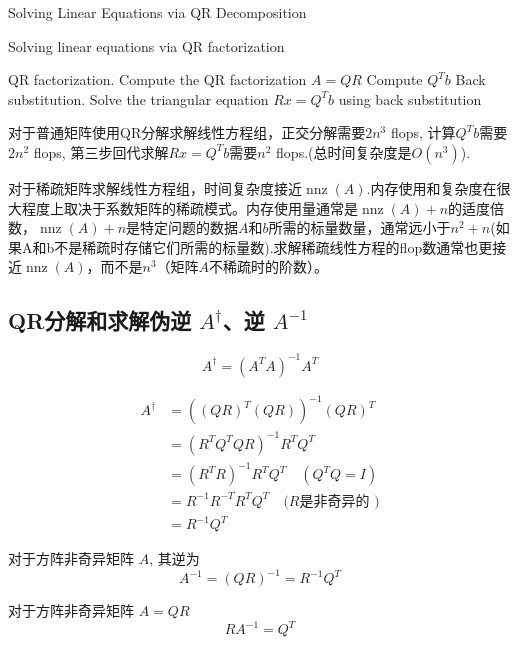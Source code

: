 \begin{algorithm}[htbp]
    \caption[]{Solving Linear Equations via QR Decomposition}
    \caption{Solving linear equations via QR factorization}
    QR factorization. Compute the QR factorization $ A=Q R $\;
    Compute $ Q^{T} b $\;
    Back substitution. Solve the triangular equation $ R x=Q^{T} b $ using back substitution\;
\end{algorithm}

对于普通矩阵使用QR分解求解线性方程组，正交分解需要$2 n^3$ flops, 计算$Q^T b$需要$2n^2$ flops, 第三步回代求解$Rx = Q^Tb$需要$n^2$ flops.(总时间复杂度是$O(n^3)$). 

对于稀疏矩阵求解线性方程组，时间复杂度接近$\operatorname{nnz}(A)$.内存使用和复杂度在很大程度上取决于系数矩阵的稀疏模式。内存使用量通常是$\operatorname{nnz}(A)+n$的适度倍数，$\operatorname{nnz}(A)+n$是特定问题的数据$A$和$b$所需的标量数量，通常远小于$n^2+n$(如果A和b不是稀疏时存储它们所需的标量数).求解稀疏线性方程的flop数通常也更接近$\operatorname{nnz}(A)$，而不是$n^3$（矩阵$A$不稀疏时的阶数）。


\subsection{QR分解和求解伪逆 $A^{\dagger}$、逆 $A^{-1}$}

\begin{definition}
    $$A^{\dagger}=\left(A^{T} A\right)^{-1} A^{T}$$
\end{definition}

\begin{theorem}
    $$
\begin{aligned}
A^{\dagger}&=\left((Q R)^{T}(Q R)\right)^{-1}(Q R)^{T} \\
&=\left(R^{T} Q^{T} Q R\right)^{-1} R^{T} Q^{T} \\
&=\left(R^{T} R\right)^{-1} R^{T} Q^{T} \quad\left(Q^{T} Q=I\right) \\
&=R^{-1} R^{-T} R^{T} Q^{T} \quad(R{\text {是非奇异的 })} \\
 &={R^{-1} Q^{T}}
\end{aligned}
$$
\end{theorem}

\begin{corollary}
    对于方阵非奇异矩阵 ${A}$, 其逆为
$$
A^{-1}=(Q R)^{-1}=R^{-1} Q^{T}
$$
\end{corollary}

\begin{corollary}
    对于方阵非奇异矩阵 ${A} = QR$
    $$RA^{-1} = Q^T$$
\end{corollary}

